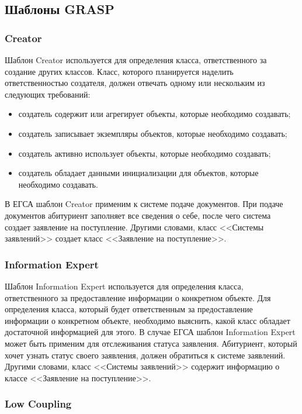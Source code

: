 \documentclass[a4paper, 14pt]{extarticle}
\begin{document}
\subsection{Шаблоны GRASP}

\subsubsection*{Creator}

Шаблон Creator используется для определения класса, ответственного за создание
других классов. Класс, которого планируется наделить ответственностью создателя,
должен отвечать одному или нескольким из следующих требований:
\begin{itemize}
  \item создатель содержит или агрегирует объекты, которые необходимо создавать;
  \item создатель записывает экземпляры объектов, которые необходимо создавать;
  \item создатель активно использует объекты, которые необходимо создавать;
  \item создатель обладает данными инициализации для объектов, которые
  необходимо создавать.
\end{itemize}
В ЕГСА шаблон Creator применим к системе подаче документов. При подаче
документов абитуриент заполняет все сведения о себе, после чего система создает
заявление на поступление. Другими словами, класс <<Системы заявлений>> создает
класс <<Заявление на поступление>>.

\subsubsection*{Information Expert}

Шаблон Information Expert используется для определения класса, ответственного за
предоставление информации о конкретном объекте. Для определения класса, который
будет ответственным за предоставление информации о конкретном объекте,
необходимо выяснить, какой класс обладает достаточной информацией для этого. В
случае ЕГСА шаблон Information Expert может быть применим для отслеживания
статуса заявления. Абитуриент, который хочет узнать статус своего заявления,
должен обратиться к системе заявлений. Другими словами, класс <<Системы
заявлений>> содержит информацию о классе <<Заявление на поступление>>.

\subsubsection*{Low Coupling}
\end{document}
